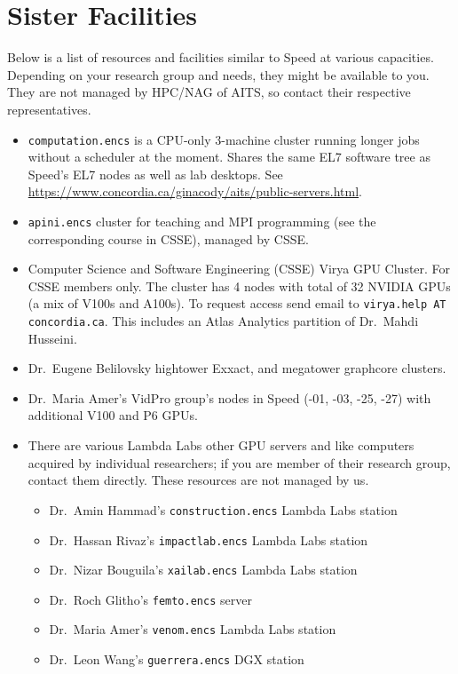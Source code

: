 \section{Sister Facilities}
\label{sect:sister-facilities}

Below is a list of resources and facilities similar to Speed at various capacities.
Depending on your research group and needs, they might be available to you. They
are not managed by HPC/NAG of AITS, so contact their respective representatives.

\begin{itemize}
    \item
    \texttt{computation.encs} is a CPU-only 3-machine cluster running longer jobs without
    a scheduler at the moment. Shares the same EL7 software tree as Speed's EL7 nodes
    as well as lab desktops. See \url{https://www.concordia.ca/ginacody/aits/public-servers.html}.

    \item
    \texttt{apini.encs} cluster for teaching and MPI programming (see the corresponding
    course in CSSE), managed by CSSE.

    \item
    Computer Science and Software Engineering (CSSE) Virya GPU Cluster. For CSSE
    members only. The cluster has 4 nodes with total of 32 NVIDIA GPUs (a mix of
    V100s and A100s). To request access send email to \texttt{virya.help AT concordia.ca}.
    This includes an Atlas Analytics partition of Dr.~Mahdi Husseini.

    \item
    Dr.~Eugene Belilovsky hightower Exxact, and megatower graphcore clusters.

    \item
    Dr.~Maria Amer's VidPro group's nodes in Speed (-01, -03, -25, -27) with additional V100 and P6 GPUs.

    \item
    There are various Lambda Labs other GPU servers and like computers
    acquired by individual researchers; if you are member of their
    research group, contact them directly. These resources are not
    managed by us.

    \begin{itemize}
        \item Dr.~Amin Hammad's \texttt{construction.encs} Lambda Labs station
        \item Dr.~Hassan Rivaz's \texttt{impactlab.encs} Lambda Labs station
        \item Dr.~Nizar Bouguila's \texttt{xailab.encs} Lambda Labs station
        \item Dr.~Roch Glitho's \texttt{femto.encs} server
        \item Dr.~Maria Amer's \texttt{venom.encs} Lambda Labs station
        \item Dr.~Leon Wang's \texttt{guerrera.encs} DGX station
    \end{itemize}


\end{itemize}
